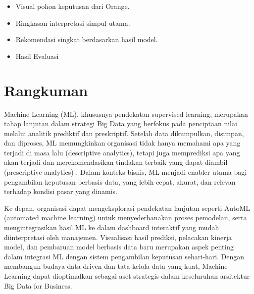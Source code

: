 \begin{itemize}
	\item Visual pohon keputusan dari Orange.
	\item Ringkasan interpretasi simpul utama.
	\item Rekomendasi singkat berdasarkan hasil model.
	\item Hasil Evaluasi
\end{itemize}


\section{Rangkuman}

Machine Learning (ML), khususnya pendekatan supervised learning, merupakan tahap lanjutan dalam strategi Big Data yang berfokus pada penciptaan nilai melalui analitik prediktif dan preskriptif. Setelah data dikumpulkan, disimpan, dan diproses, ML memungkinkan organisasi tidak hanya memahami apa yang terjadi di masa lalu (descriptive analytics), tetapi juga memprediksi apa yang akan terjadi dan merekomendasikan tindakan terbaik yang dapat diambil (prescriptive analytics) \cite{provost2013data}. Dalam konteks bisnis, ML menjadi enabler utama bagi pengambilan keputusan berbasis data, yang lebih cepat, akurat, dan relevan terhadap kondisi pasar yang dinamis.

Ke depan, organisasi dapat mengeksplorasi pendekatan lanjutan seperti AutoML (automated machine learning) untuk menyederhanakan proses pemodelan, serta mengintegrasikan hasil ML ke dalam dashboard interaktif yang mudah diinterpretasi oleh manajemen. Visualisasi hasil prediksi, pelacakan kinerja model, dan pembaruan model berbasis data baru merupakan aspek penting dalam integrasi ML dengan sistem pengambilan keputusan sehari-hari. Dengan membangun budaya data-driven dan tata kelola data yang kuat, Machine Learning dapat dioptimalkan sebagai aset strategis dalam keseluruhan arsitektur Big Data for Business.
